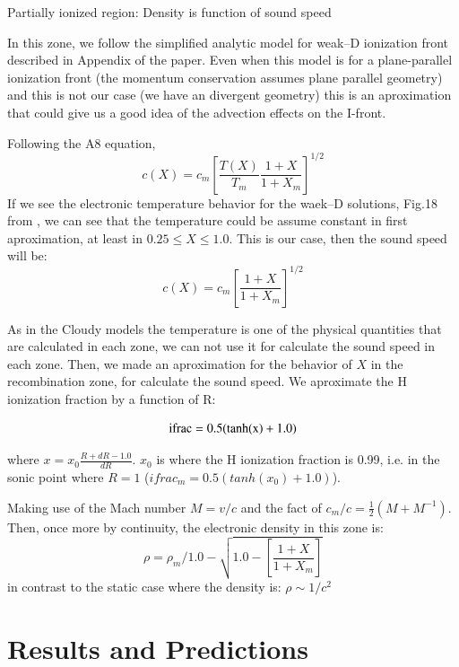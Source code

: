 \documentclass[aaspp]{article}
\newcommand{\R}{$\mathrm{R}$\xspace}
\begin{document}
Partially ionized region: Density is function of sound speed

In this zone, we follow the simplified analytic model for weak--D
ionization front described in Appendix of the
\citet{2005ApJ...621..328H} paper. Even when this model is for a
plane-parallel ionization front (the momentum conservation assumes
plane parallel geometry) and this is not our case (we have an
divergent geometry) this is an aproximation that could give us a good idea
of the advection effects on the I-front.

Following the A8 equation, 
\begin{equation}
  c(X) = c_m \left [ \frac{T(X)}{T_m} \frac{1+X}{1+X_m}\right]^{1/2}
\end{equation}
If we see the electronic temperature behavior for the waek--D
solutions, Fig.18 from \citet{2005ApJ...621..328H}, we can see that
the temperature could be assume constant in first aproximation, at
least in $0.25 \le X \le 1.0$. This is our case, then the sound speed
will be:
\begin{equation}
  c(X) = c_m \left [ \frac{1+X}{1+X_m}\right]^{1/2}
\end{equation}

As in the Cloudy models the temperature is one of the physical
quantities that are calculated in each zone, we can not use
it for calculate the sound speed in each zone. Then, we made
an aproximation for the behavior of $X$ in the recombination zone, for
calculate the sound speed. We aproximate the H ionization fraction by
a function of \R:

\begin{equation}
  \rm ifrac = 0.5 (tan h (x) + 1.0)
\end{equation}

where $x = x_0 \frac{R + dR -1.0}{dR}$. $x_0$ is where the H
ionization fraction is 0.99, i.e. in the sonic point where $R = 1$ ($ifrac_m = 0.5
(tan h (x_0) + 1.0)$).

Making use of the Mach number $M = v/c$ and the fact of $c_m/c =
\frac{1}{2} \left ( M + M^{-1} \right)$. Then, once more by
continuity, the electronic density in this zone is:
\begin{equation}
  \rho = \rho_m / 1.0 - \sqrt{ 1.0 - \left [ \frac{1+X}{1+X_m} \right ]}
\end{equation}
in contrast to the static case where the density is: $\rho \sim 1/c^2$

\section{Results and Predictions}
\label{sec:results}
\end{document}
